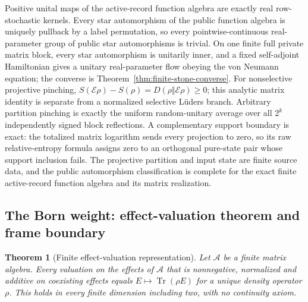 \documentclass[11pt]{article}
\newtheorem{theorem}{Theorem}[section]
\begin{document}
Positive unital maps of the active-record function algebra are exactly real
row-stochastic kernels. Every star automorphism of the public function algebra
is uniquely pullback by a label permutation, so every pointwise-continuous
real-parameter group of public star automorphisms is trivial. On one finite
full private matrix block, every star automorphism is unitarily inner, and a
fixed self-adjoint Hamiltonian gives a unitary real-parameter flow obeying the
von Neumann equation; the converse is Theorem~\ref{thm:finite-stone-converse}.
For nonselective projective pinching,
\(S(\mathcal E\rho)-S(\rho)=D(\rho\Vert\mathcal E\rho)\ge0\); this analytic
matrix identity is separate from a normalized selective L\"uders branch.
Arbitrary partition pinching is exactly the uniform random-unitary average over
all \(2^k\) independently signed block reflections. A complementary support
boundary is exact: the totalized matrix logarithm sends every projection to
zero, so its raw relative-entropy formula assigns zero to an orthogonal
pure-state pair whose support inclusion fails. The projective partition and
input state are finite source data, and the public automorphism
classification is complete for the exact finite active-record function
algebra and its matrix realization.

\subsection{The Born weight: effect-valuation theorem and frame boundary}
\label{sec:born-frame}

\begin{theorem}[Finite effect-valuation representation]
\label{thm:finite-effect-valuation}
Let \(\mathcal A\) be a finite matrix algebra. Every valuation on the effects
of \(\mathcal A\) that is nonnegative, normalized and additive on coexisting
effects equals \(E\mapsto\operatorname{Tr}(\rho E)\) for a unique density
operator \(\rho\). This holds in every finite dimension including two, with
no continuity axiom.
\end{theorem}
\end{document}

